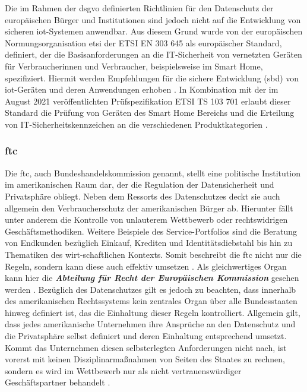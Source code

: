 Die im Rahmen der \ac{dsgvo} definierten Richtlinien für den Datenschutz der europäischen Bürger und Institutionen sind jedoch nicht auf die Entwicklung von sicheren \ac{iot}-Systemen anwendbar. Aus diesem Grund wurde von der europäischen Normungsorganisation \acl{etsi} der ETSI EN 303 645 als europäischer Standard, definiert, der die Basisanforderungen an die IT-Sicherheit von vernetzten Geräten für Verbraucherinnen und Verbraucher, beispielsweise im Smart Home, spezifiziert. 
Hiermit werden Empfehlungen für die sichere Entwicklung (\acl{sbd}) von \ac{iot}-Geräten und deren Anwendungen erhoben \cite{BSI2020}. In Kombination mit der im August 2021 veröffentlichten Prüfspezifikation ETSI TS 103 701 erlaubt dieser Standard die Prüfung von Geräten des Smart Home Bereichs und die Erteilung von IT-Sicherheitskennzeichen an die verschiedenen Produktkategorien \cite{BSI2022}.

\subsubsection{\acl{ftc}}
\label{sec:Grundlagen:ssec:Rechtliche Rahmenbedingungen:sssec:FTC}

Die \acl{ftc}, auch Bundeshandelskommission genannt, stellt eine politische Institution im amerikanischen Raum dar, der die Regulation der Datensicherheit und Privatsphäre obliegt. Neben dem Ressorts des Datenschutzes deckt sie auch allgemein den Verbraucherschutz der amerikanischen Bürger ab. 
Hierunter fällt unter anderem die Kontrolle von unlauterem Wettbewerb oder rechtswidrigen Geschäftsmethodiken. Weitere Beispiele des Service-Portfolios sind die Beratung von Endkunden bezüglich Einkauf, Krediten und Identitätsdiebstahl bis hin zu Thematiken des wirt-schaftlichen Kontexts. 
Somit beschreibt die \ac{ftc} nicht nur die Regeln, sondern kann diese auch effektiv umsetzen \cite{FTC}. Als gleichwertiges Organ kann hier die \textbf{\textit{Abteilung für Recht der Europäischen Kommission}} gesehen werden \cite{FTCEU}. Bezüglich des Datenschutzes gilt es jedoch zu beachten, dass innerhalb des amerikanischen Rechtssystems kein zentrales Organ über alle Bundesstaaten hinweg definiert ist, das die Einhaltung dieser Regeln kontrolliert. 
Allgemein gilt, dass jedes amerikanische Unternehmen ihre Ansprüche an den Datenschutz und die Privatsphäre selbst definiert und deren Einhaltung entsprechend umsetzt. Kommt das Unternehmen diesen selbsterlegten Anforderungen nicht nach, ist vorerst mit keinen Disziplinarmaßnahmen von Seiten des Staates zu rechnen, sondern es wird im Wettbewerb nur als nicht vertrauenswürdiger Geschäftspartner behandelt \cite{DatenschutzOrg2022}.

